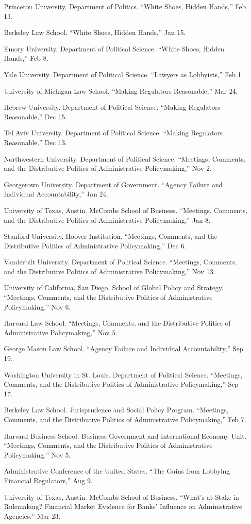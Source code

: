 \documentclass[12pt,letterpaper]{report}
\newcommand{\talk}[4]{\item[#1]{\tab{}#3. \enquote{#2,} #4.}} %
\begin{document}
    \begin{tablist}
    \talk{2025}{White Shoes, Hidden Hands}{Princeton University, Department of Politics}{Feb 13}
    \talk{2025}{White Shoes, Hidden Hands}{Berkeley Law School}{Jan 15}
    \talk{2024}{White Shoes, Hidden Hands}{Emory University, Department of Political Science}{Feb 8}
    \talk{2023}{Lawyers as Lobbyists}{Yale University. Department of Political Science}{Feb 1}
	\talk{2022}{Making Regulators Reasonable}{University of Michigan Law School}{Mar 24}
	
    \talk{2021}{Making Regulators Reasonable}{Hebrew University. Department of Political Science}{Dec 15}
    	
	\talk{2021}{Making Regulators Reasonable}{Tel Aviv University. Department of Political Science}{Dec 13}
			
	\talk{2021}{Meetings, Comments, and the Distributive Politics of Administrative Policymaking}{Northwestern University. Department of Political Science}{Nov 2}
		
    \talk{2020}{Agency Failure and Individual Accountability}{Georgetown University. Department of Government}{Jan 24}
    \talk{2020}{Meetings, Comments, and the Distributive Politics of Administrative Policymaking}{University of Texas, Austin. McCombs School of Business}{Jan 8}
    \talk{2019}{Meetings, Comments, and the Distributive Politics of Administrative Policymaking}{Stanford University. Hoover Institution}{Dec 6}
    \talk{2019}{Meetings, Comments, and the Distributive Politics of Administrative Policymaking}{Vanderbilt University. Department of Political Science}{Nov 13}
    \talk{2019}{Meetings, Comments, and the Distributive Politics of Administrative Policymaking}{University of California, San Diego. School of Global Policy and Strategy}{Nov 6}
    \talk{2019}{Meetings, Comments, and the Distributive Politics of Administrative Policymaking}{Harvard Law School}{Nov 5}    
    \talk{2019}{Agency Failure and Individual Accountability}{George Mason Law School}{Sep 19}
    \talk{2019}{Meetings, Comments, and the Distributive Politics of Administrative Policymaking}{Washington University in St. Louis. Department of Political Science}{Sep 17}    
    \talk{2019}{Meetings, Comments, and the Distributive Politics of Administrative Policymaking}{Berkeley Law School. Jurisprudence and Social Policy Program}{Feb 7}    
    \talk{2019}{Meetings, Comments, and the Distributive Politics of Administrative Policymaking}{Harvard Business School. Business Government and International Economy Unit}{Nov 5}   
    \talk{2019}{The Gains from Lobbying Financial Regulators}{Administrative Conference of the United States}{Aug 9}    
    \talk{2018}{What’s at Stake in Rulemaking? Financial Market Evidence for Banks’ Influence on Administrative Agencies}{University of Texas, Austin. McCombs School of Business}{Mar 23}
    
    \end{tablist}
\end{document}
